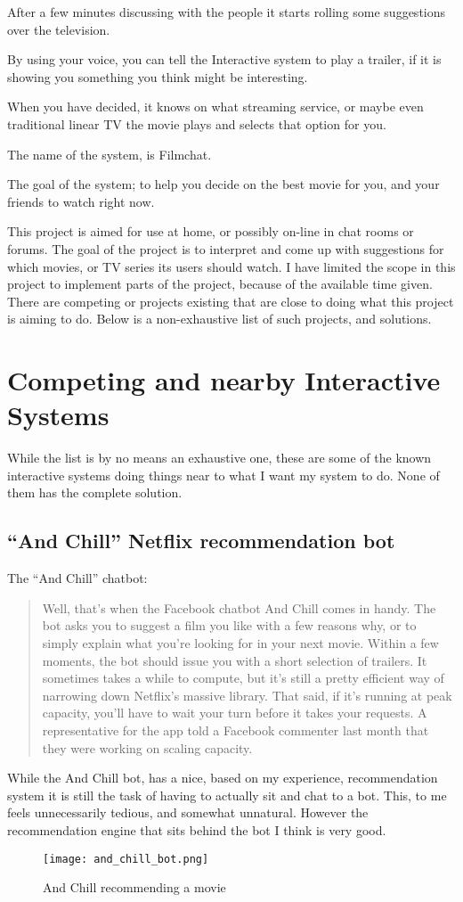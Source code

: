 \documentclass[11pt,fleqn]{book} %
\begin{document}
After a few minutes discussing with the people it starts rolling some suggestions over the television. 

By using your voice, you can tell the Interactive system to play a trailer, if it is showing you something you think might be interesting.

When you have decided, it knows on what streaming service, or maybe even traditional linear TV the movie plays and selects that option for you.

The name of the system, is Filmchat.

The goal of the system; to help you decide on the best movie for you, and your friends to watch right now.

This project is aimed for use at home, or possibly on-line in chat rooms or forums. The goal of the project is to interpret and come up with suggestions for which movies, or TV series its users should watch. I have limited the scope in this project to implement parts of the project, because of the available time given.
There are competing or projects existing that are close to doing what this project is aiming to do. Below is a non-exhaustive list of such projects, and solutions.
\section{Competing and nearby Interactive Systems}
While the list is by no means an exhaustive one, these are some of the known interactive systems doing things near to what I want my system to do. None of them has the complete solution.
\subsection{“And Chill” Netflix recommendation bot}
The “And Chill” chatbot:
\begin{quote}
Well, that’s when the Facebook chatbot And Chill comes in handy. The bot asks you to suggest a film you like with a few reasons why, or to simply explain what you’re looking for in your next movie.  
Within a few moments, the bot should issue you with a short selection of trailers. It sometimes takes a while to compute, but it’s still a pretty efficient way of narrowing down Netflix’s massive library.
That said, if it’s running at peak capacity, you’ll have to wait your turn before it takes your requests. A representative for the app told a Facebook commenter last month that they were working on scaling capacity.\cite{Williams2016TheUK}
\end{quote}
While the And Chill bot, has a nice, based on my experience, recommendation system it is still the task of having to actually sit and chat to a bot. This, to me feels unnecessarily tedious, and somewhat unnatural. However the recommendation engine that sits behind the bot I think is very good. 
\begin{figure}[]
  \centering
   \texttt{[image: and\_chill\_bot.png]}
  \caption{And Chill recommending a movie}
  \label{fig:and_chill}
\end{figure}
\end{document}
